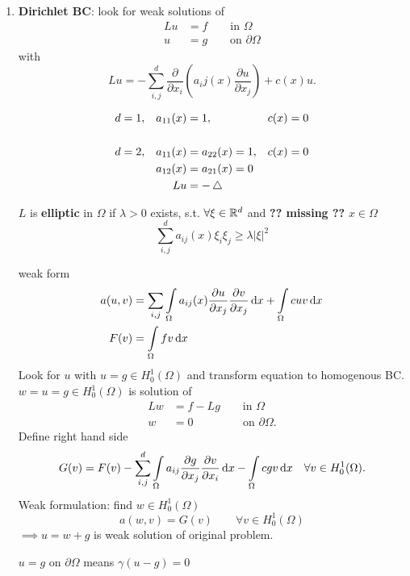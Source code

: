 \begin{enumerate}[=(\alph*)]
	\item \textbf{Dirichlet BC}:\enter
	look for weak solutions of 
	\begin{align*}
		Lu &= f \qquad \text{in } \Omega\\
		 u &= g \qquad \text{on } \partial \Omega
	\end{align*}
	with 
	\begin{equation*}
		Lu = - \displaystyle \sum^d_{i,j} \frac{\partial}{\partial x_i} \left(  a_ij(x) \frac{\partial u}{\partial x_j} \right) + c(x)u.
	\end{equation*}
	\begin{example}
		\begin{align*}
			d &= 1,&   a_{11}(x)&=1,              & c(x)&=0 \\
			  &    &            &				  &     &  \\
			d &= 2,&   a_{11}(x)&= a_{22}(x) = 1, & c(x)&=0 \\ 
			  &    &   a_{12}(x)&= a_{21}(x) = 0  &     &   \\
		  	  &    &         Lu &= -\mathop{}\!\mathbin\bigtriangleup      &     &   \\
		\end{align*}
	\end{example}
	\begin{definition_}
		$L$ is \textbf{elliptic} in $\Omega$ if $\lambda > 0$ exists, s.t. $\forall \xi \in \mathbb{R}^d$ and \textbf{?? missing ??} $x \in \Omega$
		\begin{equation*}
			\displaystyle \sum^d_{i,j} a_{ij}(x)\xi_i\xi_j \geq \lambda |\xi|^2
		\end{equation*}
	\end{definition_}
	weak form 
	\begin{align*}
		a(u,v) &= \displaystyle \sum_{i,j} \int \limits_\Omega a_{ij}(x)\frac{\partial u}{\partial x_j} \frac{\partial v}{\partial x_j} \mathop{}\!\mathrm{d} x + \int \limits_\Omega cuv \mathop{}\!\mathrm{d} x \\
		F(v)&= \int \limits_\Omega fv \mathop{}\!\mathrm{d} x
	\end{align*}
	Look for $u$ with $u = g \in H^1_0(\Omega)$ and transform equation to homogenous BC. $w = u = g \in H^1_0(\Omega)$ is solution of 
	\begin{align*}
		Lw &= f -Lg \qquad \text{in } \Omega\\
		 w &= 0 \qquad \qquad \ \,\text{on } \partial\Omega.
	\end{align*}
	Define right hand side
	\begin{equation*}
		G(v) = F(v) - \displaystyle \sum^d_{i,j} \int \limits_\Omega a_{ij} \frac{\partial g}{\partial x_j}\frac{\partial v}{\partial x_i} \mathop{}\!\mathrm{d} x - \int \limits_\Omega cgv \mathop{}\!\mathrm{d} x \quad \forall v\in H^1_0(\Omega).
	\end{equation*}
	Weak formulation: find $w\in H^1_0(\Omega)$ 
	\begin{equation*}
		a(w,v) = G(v) \qquad \forall v \in H^1_0(\Omega)
	\end{equation*}
	$\implies u = w +g$ is weak solution of original problem.
	\begin{comment_}
		$u = g $ on $\partial \Omega$ means $\gamma(u-g) = 0$
	\end{comment_}


\end{enumerate}
